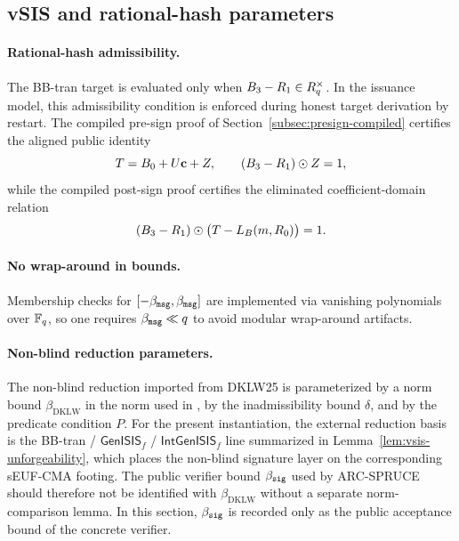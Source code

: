 \subsection{vSIS and rational-hash parameters}
\paragraph{Rational-hash admissibility.}
The BB-tran target is evaluated only when \(B_3-R_1\in R_q^\times\). In the issuance model, this admissibility
condition is enforced during honest target derivation by restart. The compiled pre-sign proof of
Section~\ref{subsec:presign-compiled} certifies the aligned public identity
\[
T = B_0 + U\mathbf{c} + Z,
\qquad
(B_3-R_1)\odot Z = 1,
\]
while the compiled post-sign proof certifies the eliminated coefficient-domain relation
\[
(B_3-R_1)\odot\bigl(T-L_B(m,R_0)\bigr)=1.
\]

\paragraph{No wrap-around in bounds.}
Membership checks for \([ -\beta_{\mathtt{msg}},\beta_{\mathtt{msg}}]\) are implemented via vanishing polynomials over \(\mathbb{F}_q\), so one
requires \(\beta_{\mathtt{msg}} \ll q\) to avoid modular wrap-around artifacts.

\paragraph{Non-blind reduction parameters.}
The non-blind reduction imported from DKLW25 is parameterized by a norm bound
\(\beta_{\mathrm{DKLW}}\) in the norm used in \cite{EPRINT:DKLW25}, by the inadmissibility bound \(\delta\), and by
the predicate condition \(P\). For the present instantiation, the external reduction basis is the BB-tran /
\(\mathsf{GenISIS}_f\) / \(\mathsf{IntGenISIS}_f\) line summarized in Lemma~\ref{lem:vsis-unforgeability}, which
places the non-blind signature layer on the corresponding sEUF-CMA footing. The public verifier bound
\(\beta_{\mathtt{sig}}\) used by ARC-SPRUCE should therefore not be identified with \(\beta_{\mathrm{DKLW}}\) without a separate
norm-comparison lemma. In this section, \(\beta_{\mathtt{sig}}\) is recorded only as the public acceptance bound of the concrete
verifier.

